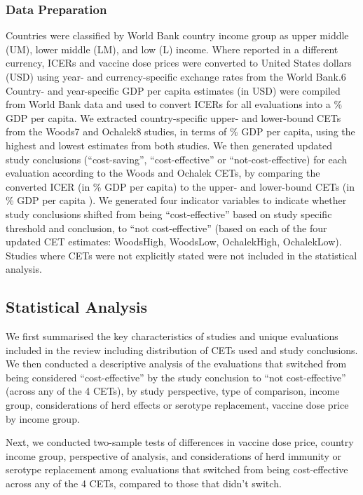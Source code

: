 \documentclass[12pt]{article}
\begin{document}
\subsubsection{Data Preparation}
Countries were classified by World Bank country income group as upper middle (UM), lower middle (LM), and low (L) income. Where reported in a different currency, ICERs and vaccine dose prices were converted to United States dollars (USD) using year- and currency-specific exchange rates from the World Bank.6 Country- and year-specific GDP per capita estimates (in USD) were compiled from World Bank data and used to convert ICERs for all evaluations into a \% GDP per capita. We extracted country-specific upper- and lower-bound CETs from the Woods7 and Ochalek8 studies, in terms of \% GDP per capita, using the highest and lowest estimates from both studies. We then generated updated study conclusions (“cost-saving”, “cost-effective” or “not-cost-effective) for each evaluation according to the Woods and Ochalek CETs, by comparing the converted ICER (in \% GDP per capita) to the upper- and lower-bound CETs (in \% GDP per capita ). We generated four indicator variables to indicate whether study conclusions shifted from being “cost-effective” based on study specific threshold and conclusion, to “not cost-effective” (based on each of the four updated CET estimates: WoodsHigh, WoodsLow, OchalekHigh, OchalekLow). Studies where CETs were not explicitly stated were not included in the statistical analysis.

\subsection{Statistical Analysis}
We first summarised the key characteristics of studies and unique evaluations included in the review including distribution of CETs used and study conclusions. We then conducted a descriptive analysis of the evaluations that switched from being considered “cost-effective” by the study conclusion to “not cost-effective” (across any of the 4 CETs), by study perspective, type of comparison, income group, considerations of herd effects or serotype replacement, vaccine dose price by income group.

Next, we conducted two-sample tests of differences in vaccine dose price, country income group, perspective of analysis, and considerations of herd immunity  or serotype replacement among evaluations that switched from being cost-effective across any of the 4 CETs, compared to those that didn’t switch.
\end{document}

